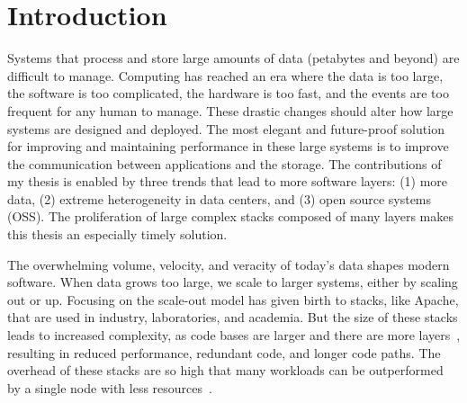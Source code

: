 \chapter{Introduction}

Systems that process and store large amounts of data (petabytes and beyond) are
difficult to manage. Computing has reached an era where the data is too large,
the software is too complicated, the hardware is too fast, and the events are
too frequent for any human to manage. These drastic changes should alter how
large systems are designed and deployed. The most elegant and future-proof
solution for improving and maintaining performance in these large systems is to
improve the communication between applications and the storage.  The
contributions of my thesis is enabled by three trends that lead to more
software layers: (1) more data, (2) extreme heterogeneity in data centers, and
(3) open source systems (OSS). The proliferation of large complex stacks
composed of many layers makes this thesis an especially timely solution.

The overwhelming volume, velocity, and veracity of today's data shapes
modern software. When data grows too large, we scale to larger systems, either
by scaling out or up. Focusing on the scale-out model has given birth to
stacks, like Apache, that are used in industry, laboratories, and academia. But
the size of these stacks leads to increased complexity, as code bases are
larger and there are more layers~\cite{sevilla:eurosys17-malacology}, resulting
in reduced performance, redundant code, and longer code paths. The overhead of
these stacks are so high that many workloads can be outperformed by a single
node with less resources~\cite{sevilla:discs2013-framework,
rowstron:hotcdp2012-hadoop-vs-single-node, schwarzkopf:hotcloud2012-7-sins,
gigaspaces:whitepaper2011-su-vs-so, michael:2007pdps-scale-up-x-scale-out}.



